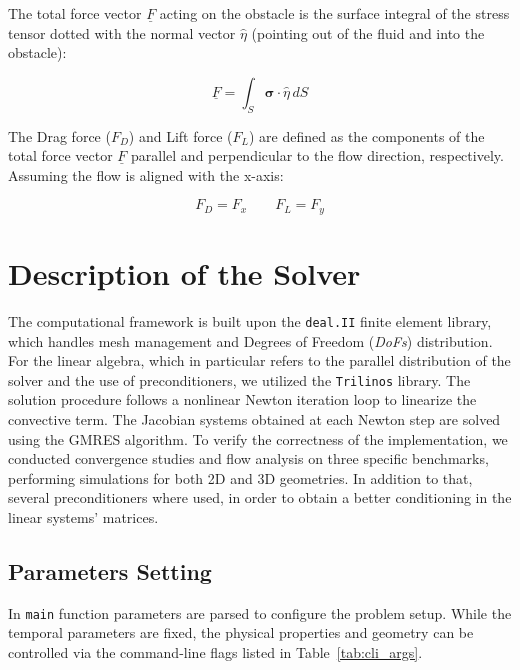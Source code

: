 \documentclass[11pt,a4paper]{article}
\renewcommand{\vec}[1]{\underline{#1}} %
\begin{document}
\vspace{5mm}

The total force vector $\vec{F}$ acting on the obstacle is the surface integral of the stress tensor dotted with the normal vector $\hat{\eta}$ (pointing out of the fluid and into the obstacle):

\begin{equation*}
    \vec{F} = \int_{S} \boldsymbol{\sigma} \cdot \hat{\eta} \, dS 
\end{equation*}

The Drag force ($F_D$) and Lift force ($F_L$) are defined as the components of the total force vector $\vec{F}$ parallel and perpendicular to the flow direction, respectively. Assuming the flow is aligned with the x-axis:

\begin{equation}
\label{eq:drag_lift_forces}
    F_D = F_x \quad \quad F_L = F_y
\end{equation}


\section{Description of the Solver}
The computational framework is built upon the \texttt{deal.II} finite element library, which handles mesh management and Degrees of Freedom (\textit{DoFs}) distribution. For the linear algebra, which in particular refers to the parallel distribution of the solver and the use of preconditioners, we utilized the \texttt{Trilinos} library. The solution procedure follows a nonlinear Newton iteration loop to linearize the convective term. The Jacobian systems obtained at each Newton step are solved using the GMRES algorithm. To verify the correctness of the implementation, we conducted convergence studies and flow analysis on three specific benchmarks, performing simulations for both 2D and 3D geometries. In addition to that, several preconditioners where used, in order to obtain a better conditioning in the linear systems' matrices.
\subsection{Parameters Setting}
In \texttt{main} function parameters are parsed to configure the problem setup. While the temporal parameters are fixed, the physical properties and geometry can be controlled via the command-line flags listed in Table~\ref{tab:cli_args}.
\end{document}
